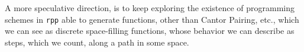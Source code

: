 \documentclass[preprint]{elsarticle}
\theoremstyle{remark}
\begin{document}
A more speculative direction, is to keep exploring the existence of programming schemes in \lstinline|rpp| able to generate functions, other than Cantor Pairing, etc., which we can see as discrete space-filling functions, whose behavior we can describe as steps, which we count, along a path in some space.




\end{document}
